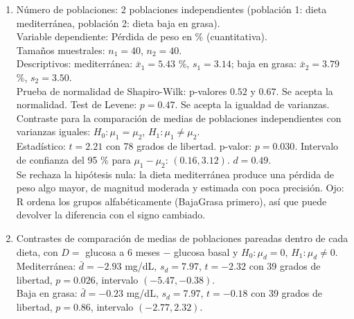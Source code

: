 \documentclass[
  spanish,
  a4paper,
]{scrreport}
\theoremstyle{definition}
\theoremstyle{remark}
\begin{document}
\begin{tcolorbox}[enhanced jigsaw, arc=.35mm, bottomrule=.15mm, bottomtitle=1mm, breakable, colback=white, colbacktitle=quarto-callout-tip-color!10!white, colframe=quarto-callout-tip-color-frame, coltitle=black, left=2mm, leftrule=.75mm, opacityback=0, opacitybacktitle=0.6, rightrule=.15mm, title=\textcolor{quarto-callout-tip-color}{\faLightbulb}\hspace{0.5em}{Solución}, titlerule=0mm, toprule=.15mm, toptitle=1mm]

\begin{enumerate}
\def\labelenumi{\alph{enumi}.}
\item
  Número de poblaciones: 2 poblaciones independientes (población 1:
  dieta mediterránea, población 2: dieta baja en grasa).\\
  Variable dependiente: Pérdida de peso en \% (cuantitativa).\\
  Tamaños muestrales: \(n_1=40\), \(n_2=40\).\\
  Descriptivos: mediterránea: \(\bar x_1=5.43\) \%, \(s_1=3.14\); baja
  en grasa: \(\bar x_2=3.79\) \%, \(s_2=3.50\).\\
  Prueba de normalidad de Shapiro-Wilk: p-valores \(0.52\) y \(0.67\).
  Se acepta la normalidad. Test de Levene: \(p=0.47\). Se acepta la
  igualdad de varianzas.\\
  Contraste para la comparación de medias de poblaciones independientes
  con varianzas iguales: \(H_0:\mu_1=\mu_2\), \(H_1:\mu_1\neq\mu_2\).\\
  Estadístico: \(t=2.21\) con 78 grados de libertad. p-valor:
  \(p=0.030\). Intervalo de confianza del 95 \% para \(\mu_1-\mu_2\):
  \((0.16, 3.12)\). \(d=0.49\).\\
  Se rechaza la hipótesis nula: la dieta mediterránea produce una
  pérdida de peso algo mayor, de magnitud moderada y estimada con poca
  precisión. Ojo: R ordena los grupos alfabéticamente (BajaGrasa
  primero), así que puede devolver la diferencia con el signo cambiado.
\item
  Contrastes de comparación de medias de poblaciones pareadas dentro de
  cada dieta, con \(D=\) glucosa a 6 meses \(-\) glucosa basal y
  \(H_0:\mu_d=0\), \(H_1:\mu_d\neq 0\).\\
  Mediterránea: \(\bar d=-2.93\) mg/dL, \(s_d=7.97\), \(t=-2.32\) con 39
  grados de libertad, \(p=0.026\), intervalo \((-5.47, -0.38)\).\\
  Baja en grasa: \(\bar d=-0.23\) mg/dL, \(s_d=7.97\), \(t=-0.18\) con
  39 grados de libertad, \(p=0.86\), intervalo \((-2.77, 2.32)\).\\

\end{enumerate}
\end{tcolorbox}
\end{document}
